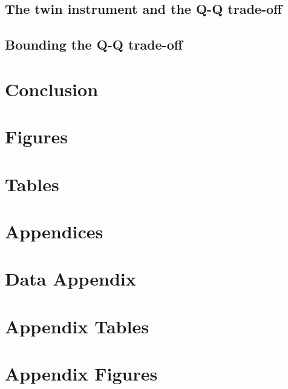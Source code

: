 \documentclass[subeqn]{article}
\begin{document}
\begin{spacing}{1.4}
\subsection{The twin instrument and the Q-Q trade-off} \label{TWINsscn:QQtwins}
\subsection{Bounding the Q-Q trade-off}            \label{TWINsscn:resultBounds}



\section{Conclusion}                               \label{TWINscn:conclusion}

\newpage
\section*{Figures}


\clearpage
\section*{Tables}

\clearpage




\newpage
\appendix
\section*{Appendices}
\section{Data Appendix}
\newpage
\end{spacing}

\section{Appendix Tables}

\newpage

\section{Appendix Figures}

\end{document}

